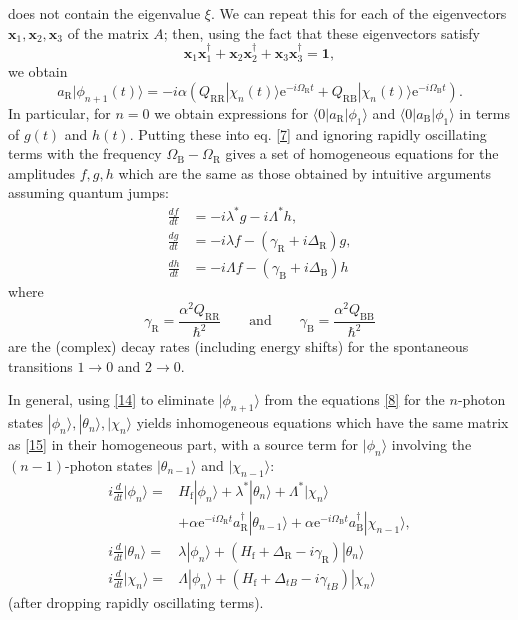 \documentclass[12pt,a4paper,reqno]{article}
\renewcommand{\(}{\left(}
\renewcommand{\)}{\right)}
\newcommand{\e}{\mbox{e}}
\renewcommand{\hbar}{\hslash}
\newcommand{\tR}{\text{R}}
\newcommand{\tB}{\text{B}}
\newcommand{\tf}{\text{f}}
\newcommand{\<}{\langle}
\renewcommand{\>}{\rangle}
\theoremstyle{plain} %
\theoremstyle{definition}
\theoremstyle{remark}
\begin{document}
does not contain the eigenvalue $\xi$. We can repeat this for each of
the eigenvectors $\mathbf{x}_1, \mathbf{x}_2, \mathbf{x}_3$ of the
matrix $A$; then, using the fact that these eigenvectors satisfy
\[
\mathbf{x}_1\mathbf{x}_1^\dagger + \mathbf{x}_2\mathbf{x}_2^\dagger
+ \mathbf{x}_3\mathbf{x}_3^\dagger = \mathbf{1},
\]
we obtain
\begin{equation}\label{14}
a_{\tR}|\phi_{n+1}(t)\> =
-i\alpha\(Q_{\tR\tR}|\chi_n(t)\>\e^{-i\Omega_{\tR}t} +
Q_{\tR\tB}|\chi_n(t)\>\e^{-i\Omega_{\tB}t}\).
\end{equation}
In particular, for $n=0$ we obtain expressions for
$\<0|a_{\tR}|\phi_1\>$ and $\<0|a_{\tB}|\phi_1\>$ in terms of $g(t)$ and
$h(t)$. Putting these into eq. \eqref{7} and ignoring rapidly
oscillating terms with the frequency $\Omega_{\tB} -\Omega_{\tR}$ gives
a set of homogeneous equations for the amplitudes $f,g,h$ which are the
same as those obtained by intuitive arguments assuming quantum jumps:
\begin{equation}\label{15}
\begin{aligned}
\frac{df}{dt} &= -i\lambda^*g-i\Lambda^*h,\\
\frac{dg}{dt} &= -i\lambda f - (\gamma_{\tR} + i\Delta_{\tR})g,\\
\frac{dh}{dt} &= -i\Lambda f - (\gamma_{\tB} + i\Delta_{\tB})h
\end{aligned}
\end{equation}
where
\[
\gamma_{\tR} = \frac{\alpha^2Q_{\tR\tR}}{\hbar^2} \qquad \mbox{and}
\qquad \gamma_{\tB} = \frac{\alpha^2 Q_{\tB\tB}}{\hbar^2}
\]
are the (complex) decay rates (including energy shifts) for the
spontaneous transitions $1\rightarrow 0$ and $2\rightarrow 0$.

In general, using \eqref{14} to eliminate $|\phi_{n+1}\>$ from the
equations \eqref{8} for the $n$-photon states
$|\phi_n\>,|\theta_n\>,|\chi_n\>$ yields inhomogeneous equations which
have the same matrix as \eqref{15} in their homogeneous part, with a
source term for $|\phi_n\>$ involving the $(n-1)$-photon states
$|\theta_{n-1}\>$ and $|\chi_{n-1}\>$:
\begin{equation}\label{16}
\begin{aligned}
i\frac{d}{dt}|\phi_n\> =& H_{\tf}|\phi_n\> + \lambda^*|\theta_n\>
+\Lambda^*|\chi_n\>\\
&+\alpha\e^{-i\Omega_{\tR}t}a_{\tR}^\dagger|\theta_{n-1}\> +
\alpha\e^{-i\Omega_{\tB}t}a_{\tB}^\dagger|\chi_{n-1}\>,\\
i\frac{d}{dt}|\theta_n\> =& \lambda|\phi_n\> + 
(H_{\tf} + \Delta_{\tR} -i\gamma_{\tR})|\theta_n\>\\
i\frac{d}{dt}|\chi_n\> =& \Lambda|\phi_n\> + (H_{\tf} + \Delta_{tB}
-i\gamma_{tB})|\chi_n\>
\end{aligned}
\end{equation}
(after dropping rapidly oscillating terms).
\end{document}
